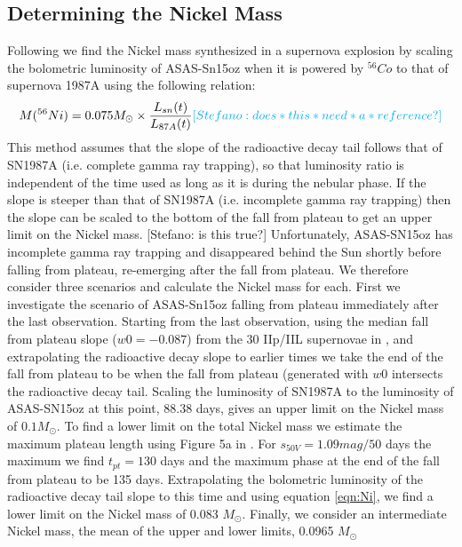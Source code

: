 \documentclass[preprint]{aastex61}
\newcommand{\stefanocomment}[1]{{\color{cyan} [{#1}]}}
\newcommand{\Stefano}[1]{\stefanocomment{Stefano: #1}}
\begin{document}
\subsection{Determining the Nickel Mass}
Following \citet{2016Valenti} we find the Nickel mass synthesized in a supernova explosion by scaling the bolometric luminosity of ASAS-Sn15oz when it is powered by ${}^{56}Co$ to that of supernova 1987A using the following relation:
\begin{equation} \label{eqn:Ni}
M({}^{56}Ni) = 0.075M_{\odot} \times \frac{L_{sn}(t)}{L_{87A}(t)} \Stefano{does*this*need*a*reference?}
\end{equation}
This method assumes that the slope of the radioactive decay tail follows that of SN1987A (i.e. complete gamma ray trapping), so that luminosity ratio is independent of the time used as long as it is during the nebular phase. 
If the slope is steeper than that of SN1987A (i.e. incomplete gamma ray trapping) then the slope can be scaled to the bottom of the fall from plateau to get an upper limit on the Nickel mass. \Stefano{is this true?}
Unfortunately, ASAS-SN15oz has incomplete gamma ray trapping and disappeared behind the Sun shortly before falling from plateau, re-emerging after the fall from plateau. 
We therefore consider three scenarios and calculate the Nickel mass for each.
First we investigate the scenario of ASAS-Sn15oz falling from plateau immediately after the last observation.
Starting from the last observation, using the median fall from plateau slope ($w0 = -0.087$) from the 30 IIp/IIL supernovae in \citet{2016valenti}, and extrapolating the radioactive decay slope to earlier times we take the end of the fall from plateau to be when the fall from plateau (generated with $w0$ intersects the radioactive decay tail. 
Scaling the luminosity of SN1987A to the luminosity of ASAS-SN15oz at this point, 88.38 days, gives an upper limit on the Nickel mass of $0.1 M_{\odot}$.
To find a lower limit on the total Nickel mass we estimate the maximum plateau length using Figure 5a in \citet{2016valenti}. 
For $s_{50V} = 1.09 mag/50$ days the maximum we find $t_{pt} =130$ days and the maximum phase at the end of the fall from plateau to be 135 days.
Extrapolating the bolometric luminosity of the radioactive decay tail slope to this time and using equation \ref{eqn:Ni}, we find a lower limit on the Nickel mass of 0.083 $M_{\odot}$.
Finally, we consider an intermediate Nickel mass, the mean of the upper and lower limits, 0.0965 $M_{\odot}$
\end{document}
